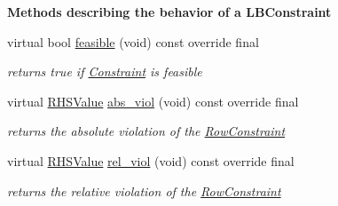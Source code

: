 \begin{Indent}\textbf{ Methods describing the behavior of a L\+B\+Constraint}\par
\begin{DoxyCompactItemize}
\item 
virtual bool \mbox{\hyperlink{class_s_m_spp__di__unipi__it_1_1_l_b_constraint_a575ce9dd82d423f5d6e9699622935415}{feasible}} (void) const override final
\begin{DoxyCompactList}\small\item\em returns true if \mbox{\hyperlink{class_s_m_spp__di__unipi__it_1_1_constraint}{Constraint}} is feasible \end{DoxyCompactList}\item 
virtual \mbox{\hyperlink{class_s_m_spp__di__unipi__it_1_1_row_constraint_a8813536ab3b13a81c8e83a999ade3bd8}{R\+H\+S\+Value}} \mbox{\hyperlink{class_s_m_spp__di__unipi__it_1_1_l_b_constraint_a1e06e555eab5078e4d5ec16745778984}{abs\+\_\+viol}} (void) const override final
\begin{DoxyCompactList}\small\item\em returns the absolute violation of the \mbox{\hyperlink{class_s_m_spp__di__unipi__it_1_1_row_constraint}{Row\+Constraint}} \end{DoxyCompactList}\item 
virtual \mbox{\hyperlink{class_s_m_spp__di__unipi__it_1_1_row_constraint_a8813536ab3b13a81c8e83a999ade3bd8}{R\+H\+S\+Value}} \mbox{\hyperlink{class_s_m_spp__di__unipi__it_1_1_l_b_constraint_a44cb3a18055d2b46764d4eb21a0ff032}{rel\+\_\+viol}} (void) const override final
\begin{DoxyCompactList}\small\item\em returns the relative violation of the \mbox{\hyperlink{class_s_m_spp__di__unipi__it_1_1_row_constraint}{Row\+Constraint}} \end{DoxyCompactList}\end{DoxyCompactItemize}
\end{Indent}
